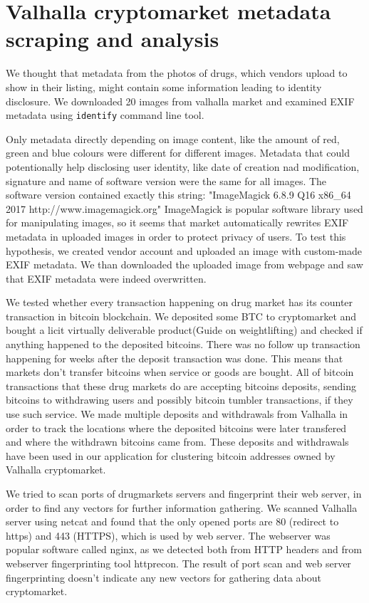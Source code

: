 \documentclass[
  digital, %
  table,   %
  lof,     %
  lot,     %
  oneside
]{fithesis3}
\begin{document}
\section{Valhalla cryptomarket metadata scraping and analysis}

We thought that metadata from the photos of drugs, which vendors upload
to show in their listing, might contain some information leading to identity disclosure.
We downloaded 20 images from valhalla market and examined 
EXIF metadata using \texttt{identify} command line tool.

Only metadata directly depending on image content, like the amount of red, green and blue colours
were different for different images.
Metadata that could potentionally help disclosing user identity,
like date of creation nad modification, signature and name of software version were the same for all images.
The software version contained exactly this string:
"ImageMagick 6.8.9 Q16 x86\_64 2017 http://www.imagemagick.org"
ImageMagick is popular software library used for manipulating images, so it seems
that market automatically rewrites EXIF metadata in uploaded images in order to protect privacy of users.
To test this hypothesis, we created vendor account and uploaded an image with
custom-made EXIF metadata. We than downloaded the uploaded image from webpage and 
saw that EXIF metadata were indeed overwritten.

We tested whether every transaction happening on drug market has its counter transaction
in bitcoin blockchain.
We deposited some BTC to cryptomarket and bought a licit virtually deliverable
product(Guide on weightlifting) and checked if anything happened to the deposited bitcoins.
There was no follow up transaction happening for weeks after the deposit transaction was done.
This means that markets don't transfer bitcoins when service or goods are bought.
All of bitcoin transactions that these drug markets do 
are accepting bitcoins deposits,
sending bitcoins to withdrawing users and possibly bitcoin tumbler transactions, if they
use such service.
We made multiple deposits and withdrawals from Valhalla in order to track the locations
where the deposited bitcoins were later transfered and where the withdrawn
bitcoins came from. These deposits and withdrawals have been
used in our application for clustering bitcoin addresses owned by Valhalla cryptomarket.

We tried to scan ports of drugmarkets servers and fingerprint their web server,
in order to find any vectors for further information gathering. 
We scanned Valhalla server using netcat and found that the only opened ports are 80 (redirect to https) and 443 (HTTPS),
which is used by web server. The webserver was popular software called nginx, as we detected
both from HTTP headers and from webserver fingerprinting tool httprecon.
The result of port scan and web server fingerprinting doesn't indicate
any new vectors for gathering data about cryptomarket.
\end{document}
